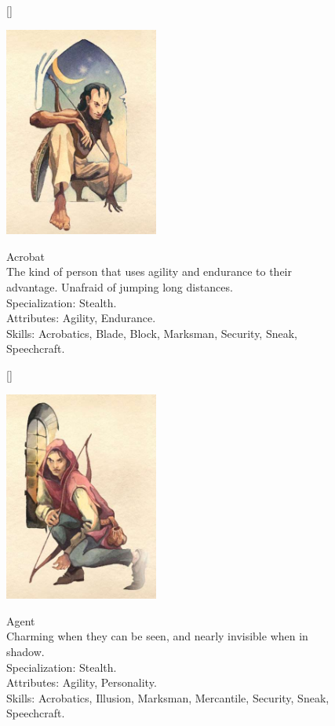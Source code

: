 \documentclass[12pt]{book}
\begin{document}
\begin{figure}[H]
[\FBwidth]
{\caption*{Acrobat\\

The kind of person that uses agility and endurance to their advantage. Unafraid of jumping long distances.\\

Specialization: Stealth.\\

Attributes: Agility, Endurance.\\

Skills: Acrobatics, Blade, Block, Marksman, Security, Sneak, Speechcraft.}\label{fig:test}}
{\includegraphics[width=0.45\textwidth]{Acrobat.png}}
\end{figure}

\begin{figure}[H]
[\FBwidth]
{\caption*{Agent\\

Charming when they can be seen, and nearly invisible when in shadow.\\

Specialization: Stealth.\\

Attributes: Agility, Personality.\\

Skills: Acrobatics, Illusion, Marksman, Mercantile, Security, Sneak, Speechcraft.}\label{fig:test}}
{\includegraphics[width=0.45\textwidth]{Agent.png}}
\end{figure}
\end{document}
